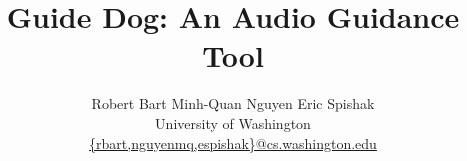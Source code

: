 \documentclass{acm_proc_article-sp}
\begin{document}

\newcommand{\includeimage}[3]{
\begin{center}
\resizebox{!}{#2}{\texttt{[image: images/\#1]}}
\vspace{-1.5\baselineskip}
\end{center}}

\title{Guide Dog: An Audio Guidance Tool}

%
%
%
%
%

%
%
%

\author{
Robert Bart
\qquad
Minh-Quan Nguyen
\qquad
Eric Spishak\\
%
{\normalsize
University of Washington}\\
\url{{rbart,nguyenmq,espishak}@cs.washington.edu}
}
\end{document}
